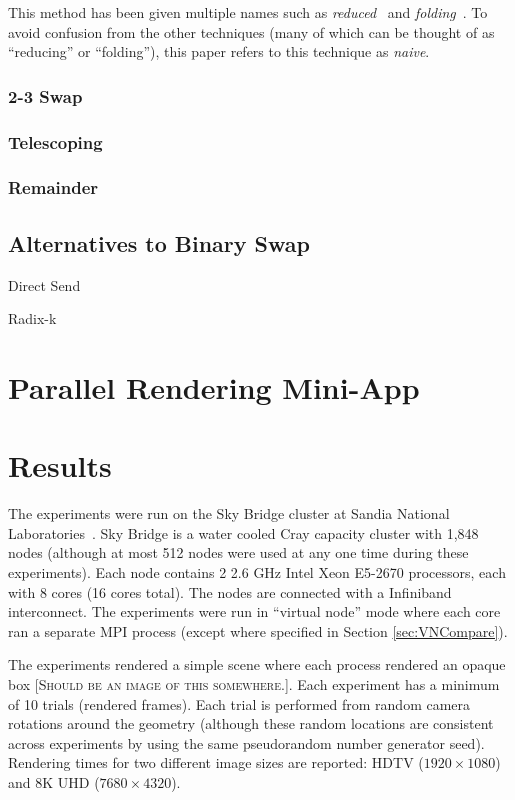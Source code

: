 \documentclass{vgtc}                          %
\newcommand*{\lcite}[1]{~\cite{#1}}
\newcommand*{\keyterm}[1]{\emph{#1}}
\newcommand{\fix}[1]{{\color{red}\textsc{[#1]}}}
\newcommand{\textalgorithm}[1]{\textsf{#1}\xspace}
\newcommand{\naive}{\textalgorithm{naive}}
\begin{document}
This method has been given multiple names such as \keyterm{reduced}\lcite{23Swap} and \keyterm{folding}\lcite{Moreland2011:SC}.
To avoid confusion from the other techniques (many of which can be thought of as ``reducing'' or ``folding''), this paper refers to this technique as \keyterm{\naive}.

\subsubsection{2-3 Swap}

\subsubsection{Telescoping}

\subsubsection{Remainder}

\subsection{Alternatives to Binary Swap}
\label{sec:BinarySwapAlternatives}

Direct Send

Radix-k

\section{Parallel Rendering Mini-App}

\section{Results}
\label{sec:Results}

The experiments were run on the Sky Bridge cluster at Sandia National Laboratories\lcite{SkyBridge}.
Sky Bridge is a water cooled Cray capacity cluster with 1,848 nodes (although at most 512 nodes were used at any one time during these experiments).
Each node contains 2 2.6 GHz Intel Xeon E5-2670 processors, each with 8 cores (16 cores total).
The nodes are connected with a Infiniband interconnect.
The experiments were run in ``virtual node'' mode where each core ran a separate MPI process (except where specified in Section \ref{sec:VNCompare}).

The experiments rendered a simple scene where each process rendered an opaque box \fix{Should be an image of this somewhere.}.
Each experiment has a minimum of 10 trials (rendered frames).
Each trial is performed from random camera rotations around the geometry (although these random locations are consistent across experiments by using the same pseudorandom number generator seed).
Rendering times for two different image sizes are reported: HDTV ($1920 \times 1080$) and 8K UHD ($7680 \times 4320$).
\end{document}
